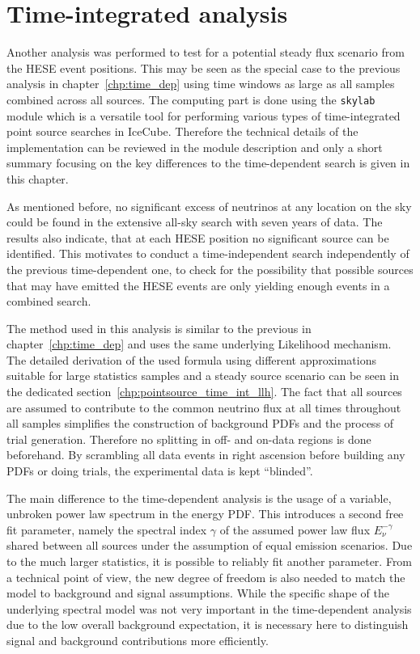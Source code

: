 \chapter{Time-integrated analysis}
  \label{chp:time_indep}
Another analysis was performed to test for a potential steady flux scenario from the HESE event positions.
This may be seen as the special case to the previous analysis in chapter~\ref{chp:time_dep} using time windows as large as all samples combined across all sources.
The computing part is done using the \lstinline!skylab! \cite{Aartsen:2016oji,skylabrepo} module which is a versatile tool for performing various types of time-integrated point source searches in IceCube.
Therefore the technical details of the implementation can be reviewed in the module description and only a short summary focusing on the key differences to the time-dependent search is given in this chapter.

As mentioned before, no significant excess of neutrinos at any location on the sky could be found in the extensive all-sky search with seven years of data.
The results also indicate, that at each HESE position no significant source can be identified.
This motivates to conduct a time-independent search independently of the previous time-dependent one, to check for the possibility that possible sources that may have emitted the HESE events are only yielding enough events in a combined search.

The method used in this analysis is similar to the previous in chapter~\ref{chp:time_dep} and uses the same underlying Likelihood mechanism.
The detailed derivation of the used formula using different approximations suitable for large statistics samples and a steady source scenario can be seen in the dedicated section~\ref{chp:pointsource_time_int_llh}.
The fact that all sources are assumed to contribute to the common neutrino flux at all times throughout all samples simplifies the construction of background PDFs and the process of trial generation.
Therefore no splitting in off- and on-data regions is done beforehand.
By scrambling all data events in right ascension before building any PDFs or doing trials, the experimental data is kept \enquote{blinded}.

The main difference to the time-dependent analysis is the usage of a variable, unbroken power law spectrum in the energy PDF.
This introduces a second free fit parameter, namely the spectral index $\gamma$ of the assumed power law flux $E_\nu^{-\gamma}$ shared between all sources under the assumption of equal emission scenarios.
Due to the much larger statistics, it is possible to reliably fit another parameter.
From a technical point of view, the new degree of freedom is also needed to match the model to background and signal assumptions.
While the specific shape of the underlying spectral model was not very important in the time-dependent analysis due to the low overall background expectation, it is necessary here to distinguish signal and background contributions more efficiently.

